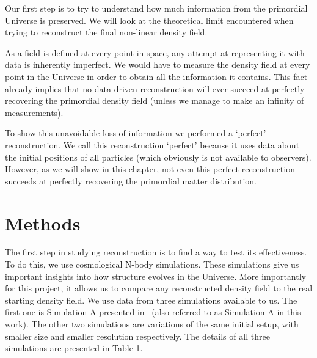 
Our first step is to try to understand how much information from the primordial Universe is preserved. We will look at the theoretical limit encountered when trying to reconstruct the final non-linear density field. 

As a field is defined at every point in space, any attempt at representing it with data is inherently imperfect. We would have to measure the density field at every point in the Universe in order to obtain all the information it contains. This fact already implies that no data driven reconstruction will ever succeed at perfectly recovering the primordial density field (unless we manage to make an infinity of measurements).

To show this unavoidable loss of information we performed a `perfect' reconstruction. We call this reconstruction `perfect' because it uses data about the initial positions of all particles (which obviously is not available to observers). However, as we will show in this chapter, not even this perfect reconstruction succeeds at perfectly recovering the primordial matter distribution.

\section{Methods}


The first step in studying reconstruction is to find a way to test its effectiveness. To do this, we use cosmological N-body simulations. These simulations give us important insights into how structure evolves in the Universe. More importantly for this project, it allows us to compare any reconstructed density field to the real starting density field. We use data from three simulations available to us. The first one is Simulation A presented in~\cite{Pontzen_paired_simulations} (also referred to as Simulation A in this work). The other two simulations are variations of the same initial setup, with smaller size and smaller resolution respectively. The details of all three simulations are presented in Table 1.

